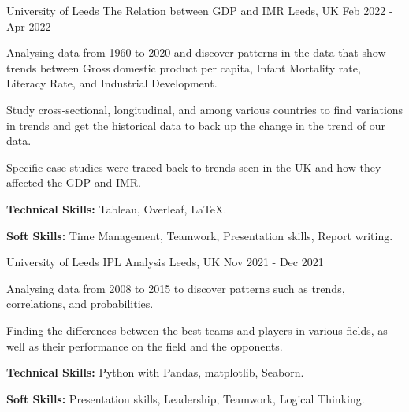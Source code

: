 

\begin{cventries}

  \cventry
    {University of Leeds} %
    {The Relation between GDP and IMR} %
    {Leeds, UK} %
    {Feb 2022 - Apr 2022} %
    {
      \begin{cvitems} %
        \item {Analysing data from 1960 to 2020 and discover patterns in the data that show trends between Gross domestic product per capita, Infant Mortality rate, Literacy Rate, and Industrial Development.}
        \item {Study cross‑sectional, longitudinal, and among various countries to find variations in trends and get the historical data to back up the change in the trend of our data.}
        \item {Specific case studies were traced back to trends seen in the UK and how they affected the GDP and IMR.}
        \item {\textbf{Technical Skills:} Tableau, Overleaf, LaTeX.}
        \item {\textbf{Soft Skills:} Time Management, Teamwork, Presentation skills, Report writing.}
      \end{cvitems}
    }


  \cventry
    {University of Leeds} %
    {IPL Analysis} %
    {Leeds, UK} %
    {Nov 2021 - Dec 2021} %
    {
      \begin{cvitems} %
        \item {Analysing data from 2008 to 2015 to discover patterns such as trends, correlations, and probabilities.}
        \item {Finding the differences between the best teams and players in various fields, as well as their performance on the field and the opponents.}
        \item {\textbf{Technical Skills:} Python with Pandas, matplotlib, Seaborn.}
        \item {\textbf{Soft Skills:} Presentation skills, Leadership, Teamwork, Logical Thinking.}
      \end{cvitems}
    }


\end{cventries}
